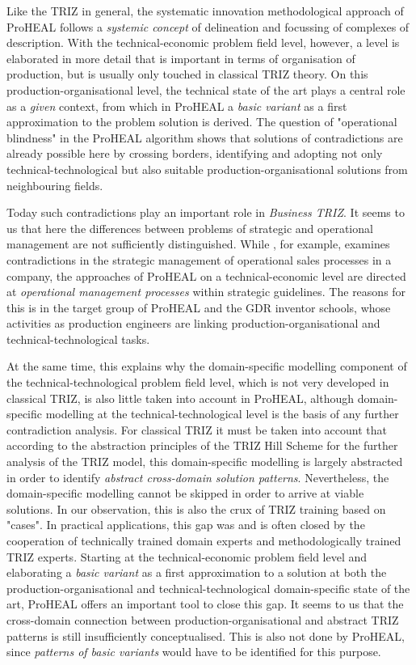 \documentclass[11pt,a4paper]{article}
\begin{document}
Like the TRIZ in general, the systematic innovation methodological approach of
ProHEAL follows a \emph{systemic concept} of delineation and focussing of
complexes of description. With the technical-economic problem field level,
however, a level is elaborated in more detail that is important in terms of
organisation of production, but is usually only touched in classical TRIZ
theory. On this production-organisational level, the technical state of the
art plays a central role as a \emph{given} context, from which in ProHEAL a
\emph{basic variant} as a first approximation to the problem solution is
derived.  The question of "operational blindness" in the ProHEAL algorithm
shows that solutions of contradictions are already possible here by crossing
borders, identifying and adopting not only technical-technological but also
suitable production-organisational solutions from neighbouring fields.

Today such contradictions play an important role in \emph{Business TRIZ}. It
seems to us that here the differences between problems of strategic and
operational management are not sufficiently distinguished. While
\cite{Kozhemyako}, for example, examines contradictions in the strategic
management of operational sales processes in a company, the approaches of
ProHEAL on a technical-economic level are directed at \emph{operational
  management processes} within strategic guidelines. The reasons for this is
in the target group of ProHEAL and the GDR inventor schools, whose activities
as production engineers are linking production-organisational and
technical-technological tasks.

At the same time, this explains why the domain-specific modelling component of
the technical-technological problem field level, which is not very developed
in classical TRIZ, is also little taken into account in ProHEAL, although
domain-specific modelling at the technical-technological level is the basis of
any further contradiction analysis. For classical TRIZ it must be taken into
account that according to the abstraction principles of the TRIZ Hill Scheme
for the further analysis of the TRIZ model, this domain-specific modelling is
largely abstracted in order to identify \emph{abstract cross-domain solution
  patterns}. Nevertheless, the domain-specific modelling cannot be skipped in
order to arrive at viable solutions. In our observation, this is also the crux
of TRIZ training based on "cases". In practical applications, this gap was and
is often closed by the cooperation of technically trained domain experts and
methodologically trained TRIZ experts. Starting at the technical-economic
problem field level and elaborating a \emph{basic variant} as a first
approximation to a solution at both the production-organisational and
technical-technological domain-specific state of the art, ProHEAL offers an
important tool to close this gap.  It seems to us that the cross-domain
connection between production-organisational and abstract TRIZ patterns is
still insufficiently conceptualised. This is also not done by ProHEAL, since
\emph{patterns of basic variants} would have to be identified for this
purpose.
\end{document}
